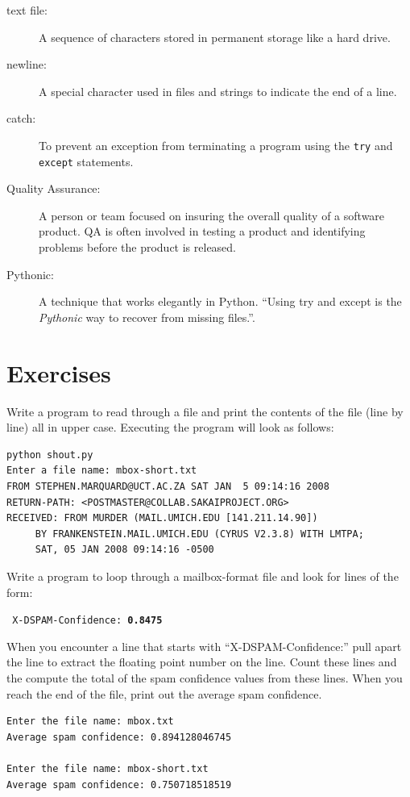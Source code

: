 \documentclass[10pt]{book}
\begin{document}
\begin{description}

\item[text file:] A sequence of characters stored in permanent
storage like a hard drive.

\item[newline:] A special character used in files and strings to indicate
the end of a line.

\item[catch:] To prevent an exception from terminating
a program using the {\tt try}
and {\tt except} statements.

\item[Quality Assurance:] A person or team focused on insuring the 
overall quality of a software product.  QA is often involved 
in testing a product and identifying problems before the product 
is released.

\item[Pythonic:] A technique that works elegantly in Python.
``Using try and except is the {\em Pythonic} way to recover from 
missing files.''.

\end{description}


\section{Exercises}

\begin{ex}
Write a program to read through a file and print the contents 
of the file (line by line) all in upper case.  Executing the program 
will look as follows:

\beforeverb
\begin{verbatim}
python shout.py
Enter a file name: mbox-short.txt
FROM STEPHEN.MARQUARD@UCT.AC.ZA SAT JAN  5 09:14:16 2008
RETURN-PATH: <POSTMASTER@COLLAB.SAKAIPROJECT.ORG>
RECEIVED: FROM MURDER (MAIL.UMICH.EDU [141.211.14.90])
	 BY FRANKENSTEIN.MAIL.UMICH.EDU (CYRUS V2.3.8) WITH LMTPA;
	 SAT, 05 JAN 2008 09:14:16 -0500
\end{verbatim}
\afterverb
\end{ex}

\begin{ex}
Write a program to loop through a mailbox-format file 
and look for lines of the form:

{\tt
X-DSPAM-Confidence: {\bf 0.8475}
}

When you encounter a line that starts with 
``X-DSPAM-Confidence:'' pull apart the line to extract the
floating point number on the line.  Count these 
lines and the compute the total of the spam confidence 
values from these lines.
When you reach the end of the file, print out the average
spam confidence.

\beforeverb
\begin{verbatim}
Enter the file name: mbox.txt
Average spam confidence: 0.894128046745

Enter the file name: mbox-short.txt
Average spam confidence: 0.750718518519
\end{verbatim}
\afterverb
\end{ex}
\end{document}
